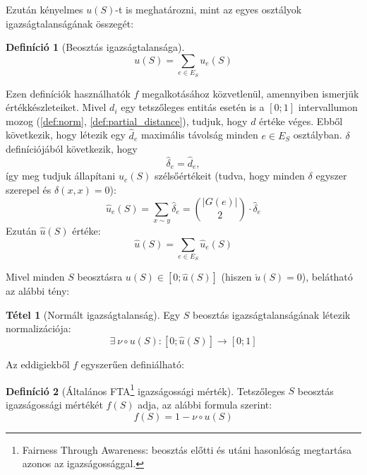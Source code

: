 \documentclass[twocolumn]{article}
\theoremstyle{definition}
\newtheorem{definition}{Definíció}[section]
\newtheorem{theorem}{Tétel}[section]
\begin{document}
    
    Ezután kényelmes $u(S)$-t is meghatározni, mint az egyes osztályok igazságtalanságának összegét:
    \begin{definition}[Beosztás igazságtalansága]
        \begin{equation}
            u(S) = \sum_{e \in E_S} u_e(S)
        \end{equation}
    \end{definition}
    
    Ezen definíciók használhatók $f$ megalkotásához közvetlenül, amennyiben ismerjük értékkészleteiket. Mivel $d_i$ egy tetszőleges entitás esetén is a $[0;1]$ intervallumon mozog (\ref{def:norm}, \ref{def:partial_distance}), tudjuk, hogy $d$ értéke véges. Ebből következik, hogy létezik egy $\hat{d}_e$ maximális távolság minden $e \in E_S$ osztályban. $\delta$ definíciójából következik, hogy $$\hat{\delta}_e = \hat{d}_e, $$
    így meg tudjuk állapítani $u_e(S)$ szélsőértékeit (tudva, hogy minden $\delta$ egyszer szerepel és $\delta(x, x) = 0$):
    \begin{equation}
    \label{eq:max_uS}
        \hat{u}_e(S) = \sum_{x \sim y} \hat{\delta}_e = \binom{|G(e)|}{2} \cdot \hat{\delta}_e
    \end{equation}
    Ezután $\hat{u}(S)$ értéke:
    \begin{equation}
    \label{eq:max_u}
        \hat{u}(S) = \sum_{e \in E_S} \hat{u}_e(S)
    \end{equation}
    
    Mivel minden $S$ beosztásra $u(S) \in [0; \hat{u}(S)]$ (hiszen $\check{u}(S) = 0$), belátható az alábbi tény:
    \begin{theorem}[Normált igazságtalanság]
        Egy $S$ beosztás igazságtalanságának létezik normalizációja:
        \begin{equation}
            \exists \ \nu \circ u(S): [0; \hat{u}(S)] \to [0; 1]
        \end{equation}
    \end{theorem}
    
    Az eddigiekből $f$ egyszerűen definiálható:
    
    \begin{definition}[Általános FTA\footnote{Fairness Through Awareness: beosztás előtti és utáni hasonlóság megtartása azonos az igazságossággal.} igazságossági mérték]
        Tetszőleges $S$ beosztás igazságossági mértékét $f(S)$ adja, az alábbi formula szerint:
        \begin{equation}
            f(S) = 1 - \nu \circ u(S)
        \end{equation}
    \end{definition}
    
\end{document}
